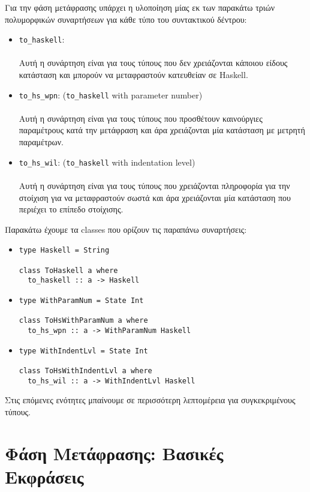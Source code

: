\documentclass[diploma]{softlab-thesis}
\def\H{Haskell}
\begin{document}
Για την φάση μετάφρασης υπάρχει η υλοποίηση μίας εκ των παρακάτω τριών
πολυμορφικών συναρτήσεων για κάθε τύπο του συντακτικού δέντρου:

\begin{itemize}
\item
\verb|to_haskell|:\\\\
Αυτή η συνάρτηση είναι για τους τύπους που δεν χρειάζονται κάποιου είδους
κατάσταση και μπορούν να μεταφραστούν κατευθείαν σε \H.
\item
\verb|to_hs_wpn|: (\verb|to_haskell| with parameter number) \\\\
Αυτή η συνάρτηση είναι για τους τύπους που προσθέτουν καινούργιες παραμέτρους
κατά την μετάφραση και άρα χρειάζονται μία κατάσταση με μετρητή παραμέτρων.
\item
\verb|to_hs_wil|: (\verb|to_haskell| with indentation level)\\\\
Αυτή η συνάρτηση είναι για τους τύπους που χρειάζονται πληροφορία για την
στοίχιση για να μεταφραστούν σωστά και άρα χρειάζονται μία κατάσταση που
περιέχει το επίπεδο στοίχισης.
\end{itemize}
Παρακάτω έχουμε τα classes που ορίζουν τις παραπάνω συναρτήσεις:
\begin{itemize}
\item
\begin{verbatim}
type Haskell = String

class ToHaskell a where
  to_haskell :: a -> Haskell
\end{verbatim}

\item
\begin{verbatim}
type WithParamNum = State Int

class ToHsWithParamNum a where
  to_hs_wpn :: a -> WithParamNum Haskell
\end{verbatim}

\item
\begin{verbatim}
type WithIndentLvl = State Int

class ToHsWithIndentLvl a where
  to_hs_wil :: a -> WithIndentLvl Haskell
\end{verbatim}
\end{itemize}
Στις επόμενες ενότητες μπαίνουμε σε περισσότερη λεπτομέρεια για συγκεκριμένους
τύπους.

\newpage

\section{Φάση Μετάφρασης: Βασικές Εκφράσεις}
\end{document}
